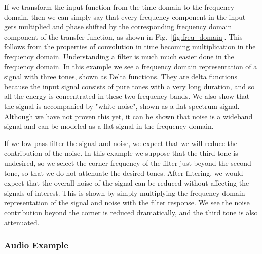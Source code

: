 If we transform the input function from the time domain to the frequency domain, then we can simply say that every frequency component in the input gets multiplied and phase shifted by the corresponding frequency domain component of the transfer function, as shown in Fig.~\ref{fig:freq_domain}.  This follows from the properties of convolution in time becoming multiplication in the frequency domain.  Understanding a filter is much much easier done in the frequency domain.  In this example we see a frequency domain representation of a signal with three tones, shown as Delta functions.  They are delta functions because the input signal consists of pure tones with a very long duration, and so all the energy is concentrated in these two frequency bands.  We also show that the signal is accompanied by "white noise", shown as a flat spectrum signal.  Although we have not proven this yet, it can be shown that noise is a wideband signal and can be modeled as a flat signal in the frequency domain.

If we low-pass filter the signal and noise, we expect that we will reduce the contribution of the noise.  In this example we suppose that the third tone is undesired, so we select the corner frequency of the filter just beyond the second tone, so that we do not attenuate the desired tones.  After filtering,   we would expect that the overall noise of the signal can be reduced without affecting the signals of interest.  This is shown by simply multiplying the frequency domain representation of the signal and noise with the filter response.  We see the noise contribution beyond the corner is reduced dramatically, and the third tone is also attenuated.
 

\subsubsection{Audio Example}

